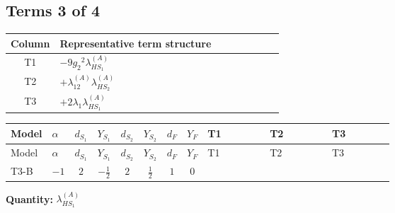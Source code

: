 \documentclass[8pt]{article}
\begin{document}
\begin{landscape}
\subsection*{Terms 3 of 4}
\begin{center}
\begin{tabular}{@{}c >{\raggedright\arraybackslash}p{0.82\linewidth}@{}}
\toprule
Column & Representative term structure \\
\midrule
T1 & \(\displaystyle -9 {g_2}^2 {\lambda_{HS_1}^{(A)}}\) \\
\midrule
T2 & \(\displaystyle +{\lambda_{12}^{(A)}} {\lambda_{HS_2}^{(A)}}\) \\
\midrule
T3 & \(\displaystyle +2 {\lambda_1} {\lambda_{HS_1}^{(A)}}\) \\
\midrule
\bottomrule
\end{tabular}
\end{center}
\smallskip
\tiny
\begin{longtable}{@{}llcccccc >{\raggedright\arraybackslash}p{0.21\linewidth} >{\raggedright\arraybackslash}p{0.21\linewidth} >{\raggedright\arraybackslash}p{0.21\linewidth}@{}}
\toprule
Model & $\alpha$ & $d_{S_1}$ & $Y_{S_1}$ & $d_{S_2}$ & $Y_{S_2}$ & $d_F$ & $Y_F$ & T1 & T2 & T3 \\
\midrule
\endfirsthead
\toprule
Model & $\alpha$ & $d_{S_1}$ & $Y_{S_1}$ & $d_{S_2}$ & $Y_{S_2}$ & $d_F$ & $Y_F$ & T1 & T2 & T3 \\
\midrule
\endhead
T3-B & $-1$ & $2$ & $-\frac{1}{2}$ & $2$ & $\frac{1}{2}$ & $1$ & $0$ & \scriptsize\adjustbox{max width=\linewidth}{$\begin{gathered} -9 {g_2}^2 {\lambda_{HS_1}^{(A)}}\end{gathered}$} & \scriptsize\adjustbox{max width=\linewidth}{$\begin{gathered} +{\lambda_{12}^{(A)}} {\lambda_{HS_2}^{(A)}}\end{gathered}$} & \scriptsize\adjustbox{max width=\linewidth}{$\begin{gathered} +2 {\lambda_1} {\lambda_{HS_1}^{(A)}}\end{gathered}$} \\
\midrule
\bottomrule
\end{longtable}
\clearpage
\noindent\textbf{Quantity: }$\lambda_{HS_1}^{(A)}$\par\smallskip

\end{landscape}
\end{document}

